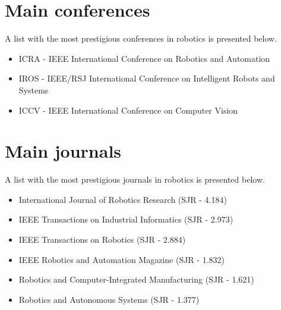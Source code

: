 \section{Main conferences}

A list with the most prestigious conferences in robotics is presented below.

\begin{itemize}
	\item ICRA - IEEE International Conference on Robotics and Automation
	\item IROS - IEEE/RSJ International Conference on Intelligent Robots and Systems
	\item ICCV - IEEE International Conference on Computer Vision
\end{itemize}



\section{Main journals}

A list with the most prestigious journals in robotics is presented below.

\begin{itemize}
	\item International Journal of Robotics Research (SJR - 4.184)
	\item IEEE Transactions on Industrial Informatics (SJR - 2.973)
	\item IEEE Transactions on Robotics (SJR - 2.884)
	\item IEEE Robotics and Automation Magazine (SJR - 1.832)
	\item Robotics and Computer-Integrated Manufacturing (SJR - 1.621)
	\item Robotics and Autonomous Systems (SJR - 1.377)
\end{itemize}
